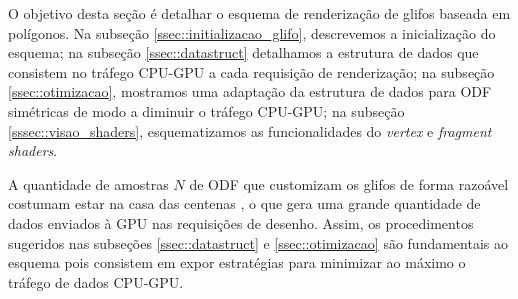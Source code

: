 \documentclass[
    12pt,                %
    oneside,            %
    a4paper,            %
    english,            %
    french,                %
    spanish,            %
    brazil                %
    ]{abntex2}
\begin{document}





O objetivo desta seção é detalhar o esquema de renderização de glifos baseada em polígonos. Na subseção \ref{ssec::initializacao_glifo}, descrevemos a inicialização do esquema; na subseção \ref{ssec::datastruct} detalhamos a estrutura de dados que consistem no tráfego CPU-GPU a cada requisição de renderização; na subseção \ref{ssec::otimizacao}, mostramos uma adaptação da estrutura de dados para ODF simétricas de modo a diminuir o tráfego CPU-GPU; na subseção \ref{sssec::visao_shaders}, esquematizamos as funcionalidades do \textit{vertex} e \textit{fragment shaders}.


A quantidade de amostras $N$ de ODF que customizam os glifos de forma razoável costumam estar na casa das centenas \cite{TuchQBall2004, yeh2010}, o que gera uma grande quantidade de dados enviados à GPU nas requisições de desenho. Assim, os procedimentos sugeridos nas subseções \ref{ssec::datastruct} e \ref{ssec::otimizacao} são fundamentais ao esquema pois consistem em expor estratégias para minimizar ao máximo o tráfego de dados CPU-GPU.


\end{document}
